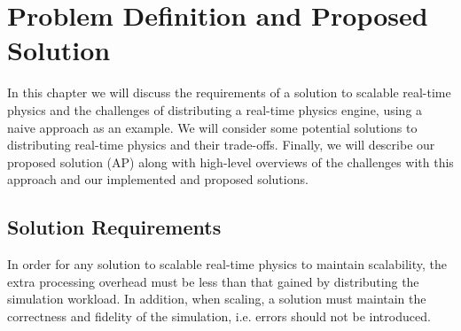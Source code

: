 \chapter{Problem Definition and Proposed Solution}

In this chapter we will discuss the requirements of a solution to scalable real-time physics and the challenges of distributing a real-time physics engine, using a naive approach as an example. We will consider some potential solutions to distributing real-time physics and their trade-offs. Finally, we will describe our proposed solution (AP) along with high-level overviews of the challenges with this approach and our implemented and proposed solutions.

\section{Solution Requirements}

In order for any solution to scalable real-time physics to maintain scalability, the extra processing overhead must be less than that gained by distributing the simulation workload. In addition, when scaling, a solution must maintain the correctness and fidelity of the simulation, i.e. errors should not be introduced.

